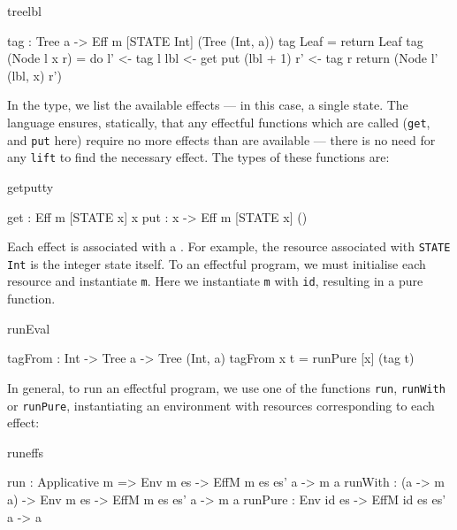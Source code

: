 \begin{SaveVerbatim}{treelbl}

tag : Tree a -> Eff m [STATE Int] (Tree (Int, a))
tag Leaf = return Leaf
tag (Node l x r) 
     = do l' <- tag l
          lbl <- get
          put (lbl + 1)
          r' <- tag r
          return (Node l' (lbl, x) r')

\end{SaveVerbatim}

\noindent
In the type, we list the available effects ---  in this case, 
a single state. The \Eff{} language ensures, statically, that any
effectful functions which are called (\texttt{get}, and \texttt{put} here)
require no more effects than are available --- there is no need for any
\texttt{lift} to find the necessary effect. The types of these functions are:

\begin{SaveVerbatim}{getputty}

get : Eff m [STATE x] x
put : x -> Eff m [STATE x] ()

\end{SaveVerbatim}

\noindent
Each effect is associated with a . For example, the resource
associated with \texttt{STATE Int} is the integer state itself.  To 
an effectful program, we must initialise each resource and instantiate
\texttt{m}. Here we instantiate \texttt{m} with \texttt{id}, resulting in a
pure function.

\begin{SaveVerbatim}{runEval}

tagFrom : Int -> Tree a -> Tree (Int, a)
tagFrom x t = runPure [x] (tag t)

\end{SaveVerbatim}

\noindent
In general, to run an effectful program, we use one of the functions
\texttt{run}, \texttt{runWith} or \texttt{runPure}, instantiating an
environment with resources corresponding to each effect:

\begin{SaveVerbatim}{runeffs}

run     : Applicative m => 
          Env m es -> EffM m es es' a -> m a
runWith : (a -> m a) -> 
          Env m es -> EffM m es es' a -> m a
runPure : Env id es -> EffM id es es' a -> a

\end{SaveVerbatim}

